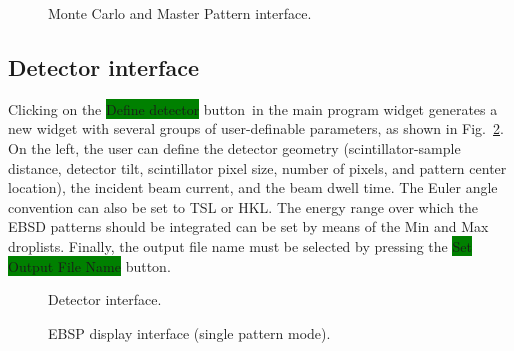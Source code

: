\documentclass[DIV=calc, paper=letter, fontsize=11pt]{scrartcl}	 %
\newcommand{\button}[1]{\colorbox{green}{\textsf{#1}} button}
\begin{document}
\begin{figure}[t]
\leavevmode\centering
\epsfxsize=6in
\caption{\label{fig:MCMPdisplay}Monte Carlo and Master Pattern interface.}
\end{figure}

\newpage
\subsection{Detector interface\label{sec:idldetector}}
Clicking on the \button{Define detector}\ in the main program widget generates a new widget with several groups of user-definable parameters, as
shown in Fig.~\ref{fig:detector}.
On the left, the user can define the detector geometry (scintillator-sample distance, detector tilt, scintillator pixel size, number of pixels, and pattern
center location), the incident beam current, and the beam dwell time.  The Euler angle convention can also be set to TSL or HKL.  The energy range 
over which the EBSD patterns should be integrated can be set by means of the Min and Max droplists.  Finally, the output file name must be selected by 
pressing the \button{Set Output File Name}.

\begin{figure}[t]
\leavevmode\centering
\epsfxsize=4in
\caption{\label{fig:detector}Detector interface.}
\end{figure}

\begin{figure}[t]
\leavevmode\centering
\epsfxsize=3in
\caption{\label{fig:EBSP}EBSP display interface (single pattern mode).}
\end{figure}
\end{document}
